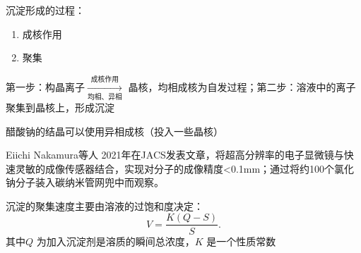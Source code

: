\begin{notation}
    沉淀形成的过程：
    \begin{enumerate}
        \item 成核作用
        \item 聚集
    \end{enumerate}
    第一步：构晶离子$\xrightarrow[\text{均相、异相}]{\text{成核作用}}$ 晶核，均相成核为自发过程；第二步：溶液中的离子聚集到晶核上，形成沉淀
\end{notation}
\begin{eg}
    醋酸钠的结晶可以使用异相成核（投入一些晶核）
\end{eg}
\begin{notation}
    Eiichi Nakamura等人\cite{doi:10.1021/jacs.0c12100} 2021年在JACS发表文章，将超高分辨率的电子显微镜与快速灵敏的成像传感器结合，实现对分子的成像精度<0.1mm；通过将约100个氯化钠分子装入碳纳米管网兜中而观察。
\end{notation}
\begin{notation}
    沉淀的聚集速度主要由溶液的过饱和度决定：\[
        V=\frac{K\left( Q-S \right)}{S}
    .\]
    其中$Q$ 为加入沉淀剂是溶质的瞬间总浓度，$K$ 是一个性质常数
\end{notation}
